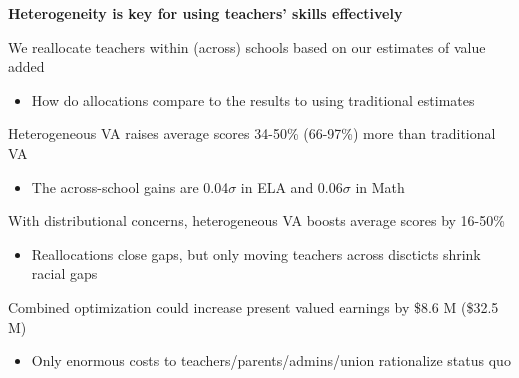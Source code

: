 \documentclass[t,aspectratio=169,11pt,presentation]{beamer}
\newenvironment{wideitemize}{\itemize\addtolength{\itemsep}{14pt}}{\enditemize}
\newenvironment{wideenumerate}{\enumerate\addtolength{\itemsep}{14pt}}{\endenumerate}
\begin{document}
\begin{frame}{\textbf{Heterogeneity is key for using teachers' skills effectively}}

    \begin{wideitemize}
    \item We reallocate teachers within (across) schools based on our estimates of value added
    \begin{itemize}
        \item<2-> How do allocations compare to the results to using traditional estimates 
    \end{itemize}
    \end{wideitemize}
    \vspace{12pt}
    \begin{wideenumerate}
    \item<3-> Heterogeneous VA raises average scores 34-50\% (66-97\%) more than traditional VA
    \begin{itemize}
        \item<4-> The across-school gains are 0.04$\sigma$ in ELA and 0.06$\sigma$ in Math

         {\tiny \color{gray} \citep[]{bates2022teacher}}
    \end{itemize}
    \item<5-> With distributional concerns, heterogeneous VA boosts average scores by 16-50\% 
    \begin{itemize}
        \item<6-> Reallocations close gaps, but only moving teachers across discticts shrink racial gaps
    \end{itemize}    
    \item<7-> Combined optimization could increase present valued earnings by \$8.6 M (\$32.5 M) 
    \begin{itemize}
        \item<9-> Only enormous costs to teachers/parents/admins/union rationalize status quo
    \end{itemize}
    \end{wideenumerate}

\end{frame}

  
\end{document}
